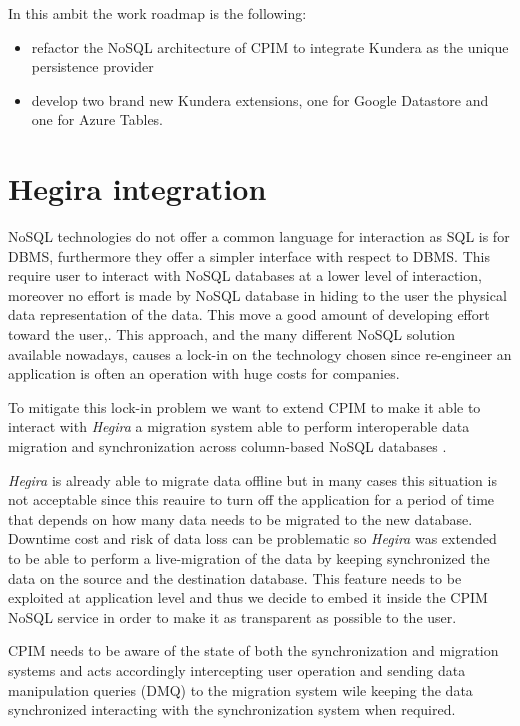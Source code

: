 \newparagraph In this ambit the work roadmap is the following:
\begin{itemize}
\item refactor the NoSQL architecture of CPIM to integrate Kundera as the unique persistence provider
\item develop two brand new Kundera extensions, one for Google Datastore and one for Azure Tables.
\end{itemize}

\section{Hegira integration}
NoSQL technologies do not offer a common language for interaction as SQL is for DBMS, furthermore they offer a simpler interface with respect to DBMS. This require user to interact with NoSQL databases at a lower level of interaction, moreover no effort is made by NoSQL database in hiding to the user the physical data representation of the data. This move a good amount of developing effort toward the user,.
This approach, and the many different NoSQL solution available nowadays, causes a lock-in on the technology chosen since re-engineer an application is often an operation with huge costs for companies.

\newparagraph To mitigate this lock-in problem we want to extend CPIM to make it able to interact with \textit{Hegira} a migration system able to perform interoperable data migration and synchronization across column-based NoSQL databases \cite{paper:modaclouds-deliverable}.

\noindent \textit{Hegira} is already able to migrate data offline but in many cases this situation is not acceptable since this reauire to turn off the application  for a period of time that depends on how many data needs to be migrated to the new database. 
Downtime cost and risk of data loss can be problematic so \textit{Hegira} was extended to be able to perform a live-migration of the data by keeping synchronized the data on the source and the destination database.
This feature needs to be exploited at application level and thus we decide to embed it inside the CPIM NoSQL service in order to make it as transparent as possible to the user.

\newparagraph CPIM needs to be aware of the state of both the synchronization and migration systems and acts accordingly intercepting user operation and sending data manipulation queries (DMQ) to the migration system wile keeping the data synchronized interacting with the synchronization system when required.



